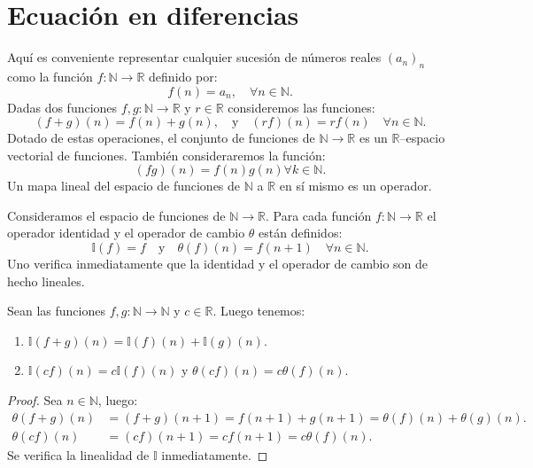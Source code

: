 \section{Ecuación en diferencias}\label{sec:difference}

Aquí es conveniente representar cualquier sucesión de números reales $(a_{n})_{n} $ como la función $f\colon\mathds{N}\rightarrow\mathds{R}$ definido por: \[ f(n)=a_{n},\quad\forall n\in\mathds{N}. \] Dadas dos funciones $f,g\colon\mathds{N}\rightarrow\mathds{R}$ y $r\in\mathds{R} $ consideremos las funciones: \[ (f+g)(n)=f(n)+g(n),\quad\text{y}\quad(rf)(n)=rf(n)\quad\forall n\in\mathds{N}. \] Dotado de estas operaciones, el conjunto de funciones de $\mathds{N}\rightarrow\mathds{R}$ es un $\mathds{R}$--espacio vectorial de funciones. También consideraremos la función: \[ (fg)(n)=f(n)g(n)\forall k\in\mathbb{N}. \] Un mapa lineal del espacio de funciones de $\mathds{N}$ a $ \mathds{R}$ en sí mismo es un operador.

\begin{definition}
Consideramos el espacio de funciones de $\mathds{N}\to\mathds{R}$. Para cada función $f\colon\mathds{N}\rightarrow\mathds{R}$ el operador identidad y el operador de cambio $\theta$ están definidos: \[ \mathds{I}(f)=f\quad\text{y}\quad\theta(f)(n)=f(n+1)\quad\forall n\in\mathds{N}. \] Uno verifica inmediatamente que la identidad y el operador de cambio son de hecho lineales.
\end{definition}

\begin{proposition}
Sean las funciones $f,g\colon\mathds{N}\to\mathds{N}$ y $c\in\mathds{R}$. Luego tenemos:
\begin{enumerate}
	\item $\mathds{I}\left(f+g\right)(n)=\mathds{I}(f)(n)+\mathds{I}(g)(n)$.
	\item $\mathds{I}\left(cf\right)(n)=c\mathds{I}(f)(n)$ y $\theta\left(cf\right)(n)=c\theta(f)(n)$.
\end{enumerate}
\end{proposition}

\begin{proof}
	Sea $n\in\mathds{N}$, luego:
	\begin{align*}
	\theta(f+g)(n)&=(f+g)(n+1)=f(n+1)+g(n+1)=\theta(f)(n)+\theta(g)(n).\\
	\theta(cf)(n)&=(cf)(n+1)=cf(n+1)=c\theta(f)(n).
	\end{align*}
	Se verifica la linealidad de $\mathds{I}$ inmediatamente.
\end{proof}

